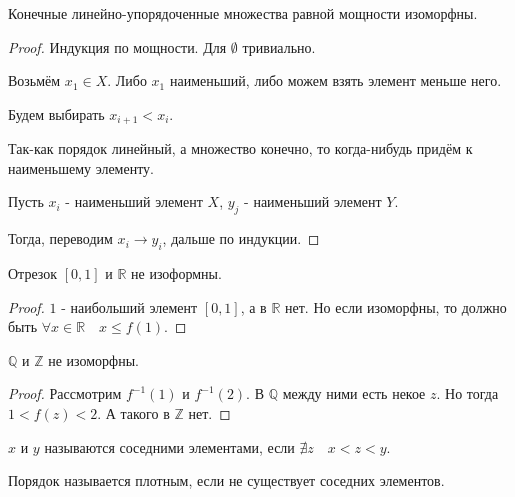 \begin{theorem} \thmslashn

    Конечные линейно-упорядоченные множества равной мощности изоморфны.

    \begin{proof} \thmslashn
    
        Индукция по мощности. Для $\emptyset$ тривиально.

        Возьмём $x_1\in X$. Либо $x_1$ наименьший, либо можем взять элемент меньше него.

        Будем выбирать $x_{i+1} < x_{i}$.

        Так-как порядок линейный, а множество конечно, то когда-нибудь придём к наименьшему элементу.

        Пусть $x_{i}$ - наименьший элемент $X$, $y_{j}$ - наименьший элемент $Y$.

        Тогда, переводим $x_{i} \to y_{i}$, дальше по индукции.
    \end{proof}
\end{theorem}
\begin{statement} \thmslashn

    Отрезок $[0, 1]$ и $\mathbb{R}$ не изоформны.
    \begin{proof} \thmslashn
    
        $1$ - наибольший элемент $[0, 1]$, а в $\mathbb{R}$ нет. Но если изоморфны, то должно быть $\forall{x\in \mathbb{R}}\quad x \le f(1)$.
    \end{proof}
\end{statement}
\begin{statement} \thmslashn

    $\mathbb{Q}$ и $\mathbb{Z}$ не изоморфны.
    \begin{proof} \thmslashn
    
        Рассмотрим $f^{-1}(1)$ и $f^{-1}(2)$. В $\mathbb{Q}$ между ними есть некое $z$. Но тогда $1 < f(z) < 2$. А такого в $\mathbb{Z}$ нет.
    \end{proof}
\end{statement}
\begin{definition} \thmslashn 

    $x$ и $y$ называются соседними элементами, если $\nexists{z}\quad x < z < y$.
\end{definition}
\begin{definition} \thmslashn 

    Порядок называется плотным, если не существует соседних элементов.
\end{definition}

